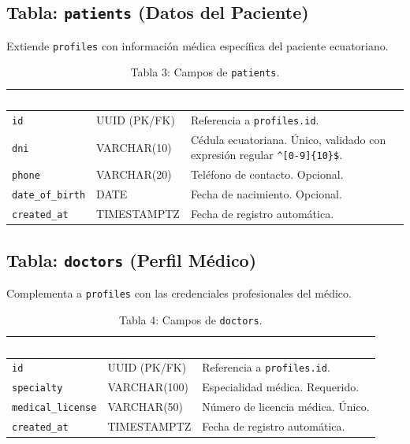 \documentclass[a4paper,12pt]{article}
\renewcommand{\arraystretch}{1.1}
\begin{document}
\subsection{Tabla: \texttt{patients} (Datos del Paciente)}
Extiende \texttt{profiles} con información médica específica del paciente ecuatoriano.

\begin{table}[H]
\centering\small\renewcommand{\arraystretch}{1.4}
\begin{tabular}{|p{3.2cm}|p{2.5cm}|p{7.8cm}|}
\hline
\rowcolor{SKTPrimary}
\textcolor{white}{\textbf{Campo}} & \textcolor{white}{\textbf{Tipo}} & \textcolor{white}{\textbf{Descripción}} \\
\hline
\texttt{id} & UUID (PK/FK) & Referencia a \texttt{profiles.id}. \\
\hline
\texttt{dni} & VARCHAR(10) & Cédula ecuatoriana. Único, validado con expresión regular \texttt{\^{}[0-9]\{10\}\$}. \\
\hline
\texttt{phone} & VARCHAR(20) & Teléfono de contacto. Opcional. \\
\hline
\texttt{date\_of\_birth} & DATE & Fecha de nacimiento. Opcional. \\
\hline
\texttt{created\_at} & TIMESTAMPTZ & Fecha de registro automática. \\
\hline
\end{tabular}
\caption*{Tabla 3: Campos de \texttt{patients}.}
\end{table}

\subsection{Tabla: \texttt{doctors} (Perfil Médico)}
Complementa a \texttt{profiles} con las credenciales profesionales del médico.

\begin{table}[H]
\centering\small\renewcommand{\arraystretch}{1.4}
\begin{tabular}{|p{3.2cm}|p{2.5cm}|p{7.8cm}|}
\hline
\rowcolor{SKTPrimary}
\textcolor{white}{\textbf{Campo}} & \textcolor{white}{\textbf{Tipo}} & \textcolor{white}{\textbf{Descripción}} \\
\hline
\texttt{id} & UUID (PK/FK) & Referencia a \texttt{profiles.id}. \\
\hline
\texttt{specialty} & VARCHAR(100) & Especialidad médica. Requerido. \\
\hline
\texttt{medical\_license} & VARCHAR(50) & Número de licencia médica. Único. \\
\hline
\texttt{created\_at} & TIMESTAMPTZ & Fecha de registro automática. \\
\hline
\end{tabular}
\caption*{Tabla 4: Campos de \texttt{doctors}.}
\end{table}
\end{document}
